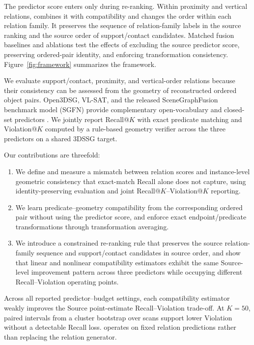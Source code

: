 The predictor score enters only during re-ranking. Within proximity and
vertical relations, \method{} combines it with compatibility and changes the
order within each relation family. It preserves the sequence of relation-family
labels in the source ranking and the source order of support/contact candidates.
Matched fusion baselines and ablations test the effects of excluding the source
predictor score, preserving ordered-pair identity, and enforcing transformation
consistency.
Figure~\ref{fig:framework} summarizes the framework.

\ifdefined\withteaser\else

\fi

We evaluate support/contact, proximity, and vertical-order relations because
their consistency can be assessed from the geometry of reconstructed ordered
object pairs.
Open3DSG, VL-SAT, and the released SceneGraphFusion benchmark model (SGFN)
provide complementary open-vocabulary and closed-set predictors
\cite{koch2024open3dsg,wang2023vlsat,wu2021scenegraphfusion}. We jointly report
Recall@$K$ with exact predicate matching and Violation@$K$ computed by a
rule-based geometry verifier across the three predictors on a shared 3DSSG
target.

Our contributions are threefold:
\begin{enumerate}
    \item We define and measure a mismatch between relation scores and
    instance-level geometric consistency that exact-match Recall alone does not
    capture, using identity-preserving evaluation and joint Recall@$K$--Violation@$K$
    reporting.
    \item We learn predicate--geometry compatibility from the corresponding
    ordered pair without using the predictor score, and enforce exact
    endpoint/predicate transformations through transformation averaging.
    \item We introduce a constrained re-ranking rule that preserves the source
    relation-family sequence and support/contact candidates in source order,
    and show that linear and nonlinear compatibility estimators exhibit the
    same Source-level improvement pattern across three predictors while
    occupying different Recall--Violation operating points.
\end{enumerate}

Across all reported predictor--budget settings, each compatibility estimator
weakly improves the Source point-estimate Recall--Violation trade-off. At
$K=50$, paired intervals from a cluster bootstrap over scans support lower
Violation without a detectable Recall loss. \method{} operates on fixed
relation predictions rather than replacing the relation generator.
